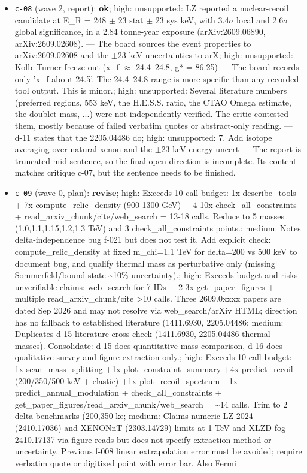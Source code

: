 \documentclass[11pt,a4paper]{article}
\begin{document}
\begin{itemize}
  \item \texttt{c-08} (wave 2, report): \textbf{ok}; high: unsupported: LZ reported a nuclear-recoil candidate at E\_R = 248 $\pm$ 23 stat $\pm$ 23 sys keV, with 3.4$\sigma$ local and 2.6$\sigma$ global significance, in a 2.84 tonne-year exposure (arXiv:2609.06890, arXiv:2609.02608). --- The board sources the event properties to arXiv:2609.02608 and the $\pm$23 keV uncertainties to arX; high: unsupported: Kolb--Turner freeze-out (x\_f $\approx$ 24.4--24.8, g* = 86.25) --- The board records only 'x\_f about 24.5'. The 24.4--24.8 range is more specific than any recorded tool output. This is minor.; high: unsupported: Several literature numbers (preferred regions, 553 keV, the H.E.S.S. ratio, the CTAO Omega estimate, the doublet mass, ...) were not independently verified. The critic contested them, mostly because of failed verbatim quotes or abstract-only reading. --- d-11 states that the 2205.04486 do; high: unsupported: 7. Add isotope averaging over natural xenon and the $\pm$23 keV energy uncert --- The report is truncated mid-sentence, so the final open direction is incomplete. Its content matches critique c-07, but the sentence needs to be finished.
  \item \texttt{c-09} (wave 0, plan): \textbf{revise}; high: Exceeds 10-call budget: 1x describe\_tools + 7x compute\_relic\_density (900-1300 GeV) + 4-10x check\_all\_constraints + read\_arxiv\_chunk/cite/web\_search = 13-18 calls. Reduce to 5 masses (1.0,1.1,1.15,1.2,1.3 TeV) and 3 check\_all\_constraints points.; medium: Notes delta-independence bug f-021 but does not test it. Add explicit check: compute\_relic\_density at fixed m\_chi=1.1 TeV for delta=200 vs 500 keV to document bug, and qualify thermal mass as perturbative only (missing Sommerfeld/bound-state \textasciitilde{}10\% uncertainty).; high: Exceeds budget and risks unverifiable claims: web\_search for 7 IDs + 2-3x get\_paper\_figures + multiple read\_arxiv\_chunk/cite \textgreater{}10 calls. Three 2609.0xxxx papers are dated Sep 2026 and may not resolve via web\_search/arXiv HTML; direction has no fallback to established literature (1411.6930, 2205.04486; medium: Duplicates d-15 literature cross-check (1411.6930, 2205.04486 thermal masses). Consolidate: d-15 does quantitative mass comparison, d-16 does qualitative survey and figure extraction only.; high: Exceeds 10-call budget: 1x scan\_mass\_splitting +1x plot\_constraint\_summary +4x predict\_recoil (200/350/500 keV + elastic) +1x plot\_recoil\_spectrum +1x predict\_annual\_modulation + check\_all\_constraints + get\_paper\_figures/read\_arxiv\_chunk/web\_search = \textasciitilde{}14 calls. Trim to 2 delta benchmarks (200,350 ke; medium: Claims numeric LZ 2024 (2410.17036) and XENONnT (2303.14729) limits at 1 TeV and XLZD fog 2410.17137 via figure reads but does not specify extraction method or uncertainty. Previous f-008 linear extrapolation error must be avoided; require verbatim quote or digitized point with error bar. Also Fermi

\end{itemize}
\end{document}
